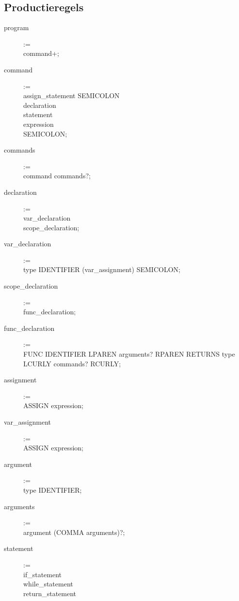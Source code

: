 \subsection{Productieregels} %
\label{sub:productieregels}
\begin{description}
    \item[program] := \hfill \\
        command+;
    \item[command] := \hfill \\
        assign\_statement SEMICOLON \textbar \\
        declaration \textbar \\
        statement \textbar \\
        expression \textbar \\
        SEMICOLON;
    \item[commands] := \hfill \\
        command commands?;
    \item[declaration] := \hfill \\
        var\_declaration \textbar \\
        scope\_declaration;
    \item[var\_declaration] := \hfill \\
        type IDENTIFIER (var\_assignment) SEMICOLON;
    \item[scope\_declaration] := \hfill \\
        func\_declaration;
    \item[func\_declaration] := \hfill \\
        FUNC IDENTIFIER LPAREN arguments? RPAREN RETURNS type LCURLY commands? RCURLY;
    \item[assignment] := \hfill \\
        ASSIGN expression;
    \item[var\_assignment] := \hfill \\
        ASSIGN expression;
    \item[argument] := \hfill \\
        type IDENTIFIER;
    \item[arguments] := \hfill \\
        argument (COMMA arguments)?;
    \item[statement] := \hfill \\
        if\_statement \textbar \\ 
        while\_statement \textbar \\
        return\_statement \textbar \\

\end{description}
